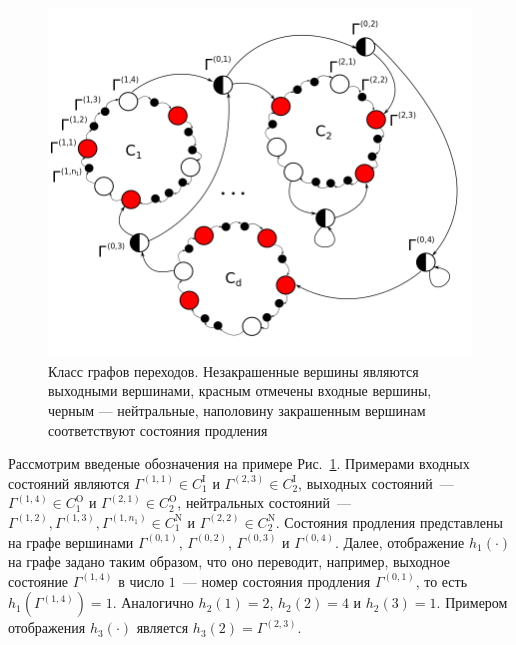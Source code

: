 \documentclass[a4paper,12pt,russian]{extarticle}
\newcommand{\ga}[1]{\Gamma^{\left( #1 \right)} }
\begin{document}
\begin{figure}[hb]\centering
\includegraphics[scale=0.5]{GraphScheme3.png} 
\caption{Класс графов переходов. Незакрашенные вершины являются выходными вершинами, красным отмечены входные вершины, черным --- нейтральные, наполовину закрашенным вершинам соответствуют состояния продления}
\label{GraphScheme}
\end{figure}

Рассмотрим введеные обозначения на примере Рис.~\ref{GraphScheme}. Примерами входных состояний являются $\ga{1,1} \in C_1^{\mathrm{I}}$ и $\ga{2,3} \in C_2^{\mathrm{I}}$, выходных состояний~--- $\ga{1,4} \in C_1^{\mathrm{O}}$ и $\ga{2,1} \in C_2^{\mathrm{O}}$, нейтральных состояний~--- $\ga{1,2}, \ga{1,3}, \ga{1,n_1} \in C_1^{\mathrm{N}}$ и $\ga{2,2} \in C_2^{\mathrm{N}}$. Состояния продления представлены на графе вершинами $\ga{0,1}$, $\ga{0,2}$, $\ga{0,3}$ и $\ga{0,4}$. Далее, отображение $h_1(\cdot)$ на графе задано таким образом, что оно переводит, например, выходное состояние $\ga{1,4}$ в число $1$~--- номер состояния продления $\ga{0,1}$, то есть $h_1(\ga{1,4})=1$. Аналогично $h_2(1)=2$, $h_2(2)=4$ и $h_2(3)=1$. Примером отображения $h_3(\cdot)$ является $h_3(2)=\ga{2,3}$.
\end{document}
